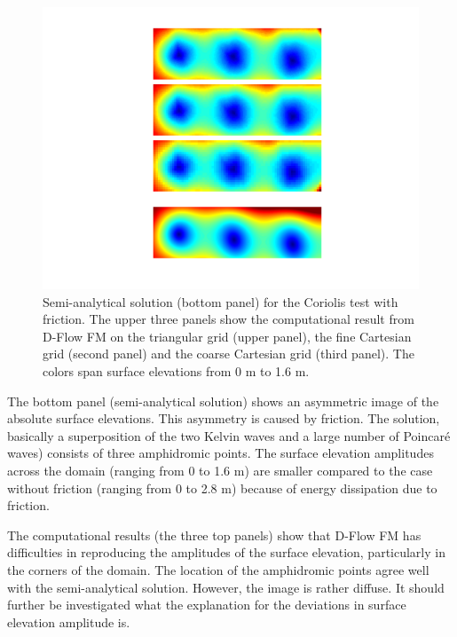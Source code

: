 \begin{figure}[h!]
\begin{center}
\includegraphics[width=1.0\columnwidth]{figures/kelvinfricyes.png}
\end{center}\caption{Semi-analytical solution (bottom panel) for the Coriolis test with friction. The upper three panels show the computational result from D-Flow FM on the triangular grid (upper panel), the fine Cartesian grid (second panel) and the coarse Cartesian grid (third panel). The colors span surface elevations from 0 m to 1.6 m. \label{fig:kelvinfricyes}}
\end{figure}

The bottom panel (semi-analytical solution) shows an asymmetric image of the absolute surface elevations. This asymmetry is caused by friction. The solution, basically a superposition of the two Kelvin waves and a large number of Poincar\'e waves) consists of three amphidromic points. The surface elevation amplitudes across the domain (ranging from 0 to 1.6 m) are smaller compared to the case without friction (ranging from 0 to 2.8 m) because of energy dissipation due to friction.

The computational results (the three top panels) show that D-Flow FM has difficulties in reproducing the amplitudes of the surface elevation, particularly in the corners of the domain. The location of the amphidromic points agree well with the semi-analytical solution. However, the image is rather diffuse. It should further be investigated what the explanation for the deviations in surface elevation amplitude is. 




